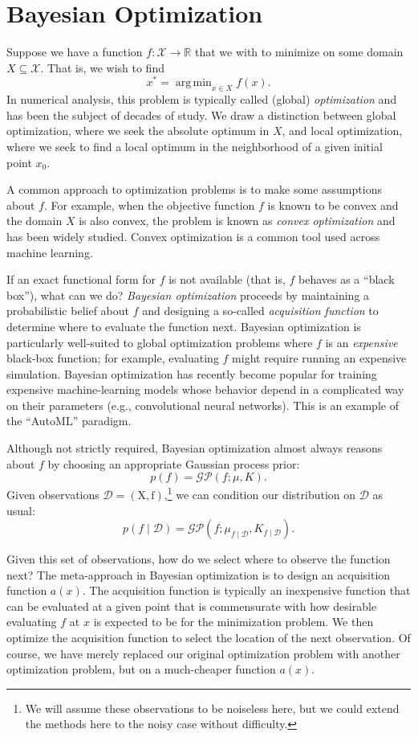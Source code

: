\documentclass{article}
\newcommand{\given}{\mid}
\newcommand{\mc}[1]{\mathcal{#1}}
\newcommand{\data}{\mc{D}}
\newcommand{\mat}[1]{\bm{\mathrm{#1}}}
\renewcommand{\vec}[1]{\bm{\mathrm{#1}}}
\newcommand{\R}{\mathbb{R}}
\DeclareMathOperator*{\argmin}{arg\,min}
\begin{document}
\section*{Bayesian Optimization}

Suppose we have a function $f\colon \mc{X} \to \R$ that we with to
minimize on some domain $X \subseteq \mc{X}$.  That is, we wish to
find
\[
  x^\ast = \argmin_{x \in X} f(x).
\]
In numerical analysis, this problem is typically called (global)
\emph{optimization} and has been the subject of decades of study.  We
draw a distinction between global optimization, where we seek the
absolute optimum in $X$, and local optimization, where we seek to find
a local optimum in the neighborhood of a given initial point $x_0$.

A common approach to optimization problems is to make some assumptions
about $f$.  For example, when the objective function $f$ is known to
be convex and the domain $X$ is also convex, the problem is known as
\emph{convex optimization} and has been widely studied.  Convex
optimization is a common tool used across machine learning.

If an exact functional form for $f$ is not available (that is, $f$
behaves as a ``black box''), what can we do?  \emph{Bayesian
  optimization} proceeds by maintaining a probabilistic belief about
$f$ and designing a so-called \emph{acquisition function} to determine
where to evaluate the function next.  Bayesian optimization is
particularly well-suited to global optimization problems where $f$ is
an \emph{expensive} black-box function; for example, evaluating $f$
might require running an expensive simulation.  Bayesian optimization
has recently become popular for training expensive machine-learning
models whose behavior depend in a complicated way on their parameters
(e.g., convolutional neural networks).  This is an example of the
``AutoML'' paradigm.

Although not strictly required, Bayesian optimization almost always
reasons about $f$ by choosing an appropriate Gaussian process prior:
\[
  p(f) = \mc{GP}(f; \mu, K).
\]
Given observations $\data = (\mat{X}, \vec{f})$,\footnote{We will
  assume these observations to be noiseless here, but we could extend
  the methods here to the noisy case without difficulty.} we can
condition our distribution on $\data$ as usual:
\[
  p(f \given \data) = \mc{GP}(f; \mu_{f \given \data}, K_{f \given \data}).
\]

Given this set of observations, how do we select where to observe the
function next?  The meta-approach in Bayesian optimization is to
design an acquisition function $a(x)$. The acquisition function is
typically an inexpensive function that can be evaluated at a given
point that is commensurate with how desirable evaluating $f$ at $x$ is
expected to be for the minimization problem.  We then optimize the
acquisition function to select the location of the next observation.
Of course, we have merely replaced our original optimization problem
with another optimization problem, but on a much-cheaper function
$a(x)$.
\end{document}
